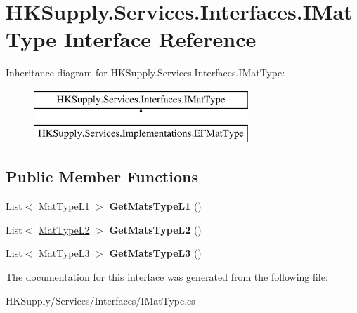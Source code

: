 \hypertarget{interface_h_k_supply_1_1_services_1_1_interfaces_1_1_i_mat_type}{}\section{H\+K\+Supply.\+Services.\+Interfaces.\+I\+Mat\+Type Interface Reference}
\label{interface_h_k_supply_1_1_services_1_1_interfaces_1_1_i_mat_type}
Inheritance diagram for H\+K\+Supply.\+Services.\+Interfaces.\+I\+Mat\+Type\+:\begin{figure}[H]
\begin{center}
\leavevmode
\includegraphics[height=2.000000cm]{interface_h_k_supply_1_1_services_1_1_interfaces_1_1_i_mat_type}
\end{center}
\end{figure}
\subsection*{Public Member Functions}
\begin{DoxyCompactItemize}
\item 
\mbox{\label{interface_h_k_supply_1_1_services_1_1_interfaces_1_1_i_mat_type_aa526cced0fdf846540d19ca9e0f8d9a1}} 
List$<$ \mbox{\hyperlink{class_h_k_supply_1_1_models_1_1_mat_type_l1}{Mat\+Type\+L1}} $>$ {\bfseries Get\+Mats\+Type\+L1} ()
\item 
\mbox{\label{interface_h_k_supply_1_1_services_1_1_interfaces_1_1_i_mat_type_a70e1e4e6c190e3e1d5d6eafab173e99f}} 
List$<$ \mbox{\hyperlink{class_h_k_supply_1_1_models_1_1_mat_type_l2}{Mat\+Type\+L2}} $>$ {\bfseries Get\+Mats\+Type\+L2} ()
\item 
\mbox{\label{interface_h_k_supply_1_1_services_1_1_interfaces_1_1_i_mat_type_af89dc604c2d2c6dbdb9184013d77b601}} 
List$<$ \mbox{\hyperlink{class_h_k_supply_1_1_models_1_1_mat_type_l3}{Mat\+Type\+L3}} $>$ {\bfseries Get\+Mats\+Type\+L3} ()
\end{DoxyCompactItemize}


The documentation for this interface was generated from the following file\+:\begin{DoxyCompactItemize}
\item 
H\+K\+Supply/\+Services/\+Interfaces/I\+Mat\+Type.\+cs\end{DoxyCompactItemize}
